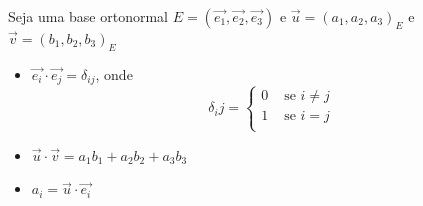 \begin{frame}{}
    Seja uma base ortonormal \(E=(\vec{e_1},\vec{e_2},\vec{e_3})\) e \(\vec{u}=(a_1,a_2,a_3)_E\) e \(\vec{v}=(b_1,b_2,b_3)_E\)
    \begin{itemize}
        \item \(\vec{e_i}\cdot\vec{e_j}=\delta_{ij}\), onde
            \[
                \delta_ij=%
                \begin{cases}
                    0 &\text{ se } i \neq j \\
                    1 &\text{ se } i = j\\
                \end{cases}
            \]
        \item \(\vec{u}\cdot\vec{v}=a_1 b_1 +a_2 b_2 + a_3 b_3\)
        \item \(a_i = \vec{u}\cdot\vec{e_i}\)
    \end{itemize}

\end{frame}

